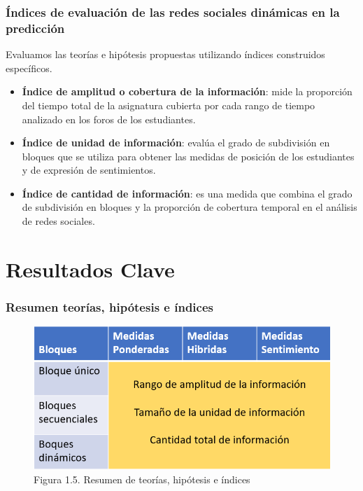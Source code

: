 \documentclass{beamer}
\begin{document}
\begin{frame}
	\frametitle{Índices de evaluación de las redes sociales dinámicas en la predicción}
	\begin{block}{Evaluamos las teorías e hipótesis propuestas utilizando índices construidos específicos.}
	\begin{itemize}
		\item \textbf{Índice de amplitud o cobertura de la información}: mide la proporción del tiempo total de la asignatura cubierta por cada rango de tiempo analizado en los foros de los estudiantes.
		\item \textbf{Índice de unidad de información}: evalúa el grado de subdivisión en bloques que se utiliza para obtener las medidas de posición de los estudiantes y de expresión de sentimientos.
		\item \textbf{Índice de cantidad de información}: es una medida que combina el grado de subdivisión en bloques y la proporción de cobertura temporal en el análisis de redes sociales.
	\end{itemize}
	\end{block}
\end{frame}



\section{Resultados Clave}

\begin{frame}
	\frametitle{Resumen teorías, hipótesis e índices}
	
	\begin{figure}[H]
		\centering
		\includegraphics[width=0.9\linewidth]{figs/imagen23}
		\caption{Figura 1.5. Resumen de teorías, hipótesis e índices}
		\label{fig:imagen23}
	\end{figure}
\end{frame}
\end{document}
